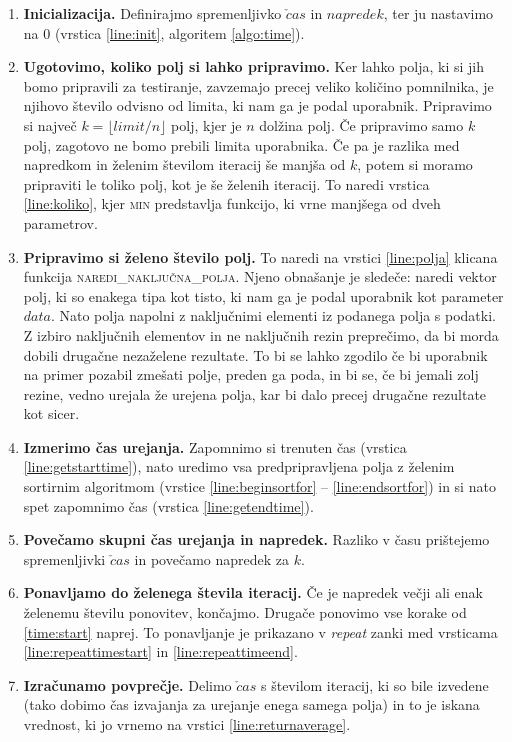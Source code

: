 \documentclass[a4paper,oneside,12pt]{article}
\begin{document}
\begin{enumerate}
  \item \textbf{Inicializacija.} Definirajmo spremenljivko $\check{c}as$ in $napredek$, ter ju nastavimo na 0
    (vrstica \ref{line:init}, algoritem \ref{algo:time}).
  \item \textbf{Ugotovimo, koliko polj si lahko pripravimo.} \label{time:start} Ker lahko 
    polja, ki si jih bomo pripravili za testiranje, zavzemajo precej veliko količino
    pomnilnika, je njihovo število odvisno od
    limita, ki nam ga je podal uporabnik. Pripravimo si največ $k = \lfloor limit/n \rfloor$
    polj, kjer je $n$ dolžina polj.
    Če pripravimo samo $k$ polj, zagotovo ne bomo prebili limita uporabnika.
    Če pa je razlika med napredkom in želenim številom iteracij še manjša
    od $k$, potem si  moramo pripraviti le toliko polj, kot je še želenih iteracij.
    To naredi vrstica \ref{line:koliko}, kjer \textsc{min} predstavlja funkcijo, ki vrne
    manjšega od dveh parametrov.
  \item \textbf{Pripravimo si želeno število polj.} To naredi na vrstici
    \ref{line:polja} klicana funkcija \textsc{naredi\_naključna\_polja}. Njeno obnašanje
    je sledeče: naredi vektor polj, ki so enakega tipa kot tisto, ki nam ga je podal 
    uporabnik kot parameter $data$. Nato polja napolni z
    naključnimi elementi iz podanega polja s podatki. Z izbiro naključnih elementov in ne 
    naključnih rezin preprečimo, da bi morda dobili drugačne nezaželene rezultate. To bi
    se lahko zgodilo če bi uporabnik na primer pozabil zmešati polje, preden ga poda, in bi se, če bi jemali 
    zolj rezine, vedno urejala že urejena polja, kar bi dalo precej drugačne rezultate 
    kot sicer.
  \item \textbf{Izmerimo čas urejanja.} Zapomnimo si trenuten čas (vrstica \ref{line:getstarttime}), nato uredimo vsa 
    predpripravljena polja z želenim
    sortirnim algoritmom (vrstice \ref{line:beginsortfor} -- \ref{line:endsortfor}) in si
    nato spet zapomnimo čas (vrstica \ref{line:getendtime}).
  \item \textbf{Povečamo skupni čas urejanja in napredek.} Razliko v času prištejemo spremenljivki $\check{c}as$ in povečamo napredek za $k$. 
  \item \textbf{Ponavljamo do želenega števila iteracij.} Če je napredek večji ali enak želenemu številu ponovitev, končajmo. 
    Drugače ponovimo vse korake od \ref{time:start} naprej. To ponavljanje je prikazano v
    \emph{repeat} zanki med vrsticama \ref{line:repeattimestart} in
    \ref{line:repeattimeend}.
  \item \textbf{Izračunamo povprečje.} Delimo $\check{c}as$ s številom iteracij, ki so bile izvedene (tako dobimo čas
    izvajanja za urejanje enega samega polja) in to je iskana vrednost, ki jo vrnemo na
    vrstici \ref{line:returnaverage}.
\end{enumerate}
\end{document}
